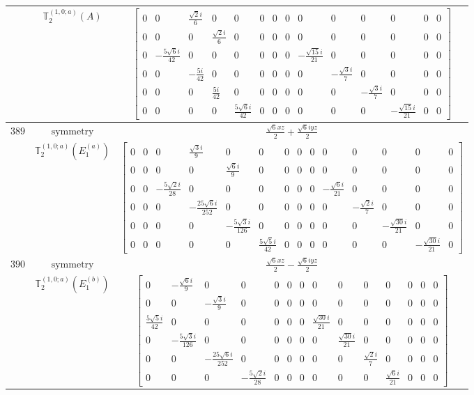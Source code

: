 \documentclass[fleqn,8pt,landscape]{jsarticle}
\begin{document}
\begin{longtable}{ccc}
$  $ & $ \mathbb{T}_{2}^{(1,0;a)}(A) $ & $ \begin{bmatrix} 0 & 0 & \frac{\sqrt{2} i}{6} & 0 & 0 & 0 & 0 & 0 & 0 & 0 & 0 & 0 & 0 & 0 \\ 0 & 0 & 0 & \frac{\sqrt{2} i}{6} & 0 & 0 & 0 & 0 & 0 & 0 & 0 & 0 & 0 & 0 \\ 0 & - \frac{5 \sqrt{6} i}{42} & 0 & 0 & 0 & 0 & 0 & 0 & - \frac{\sqrt{15} i}{21} & 0 & 0 & 0 & 0 & 0 \\ 0 & 0 & - \frac{5 i}{42} & 0 & 0 & 0 & 0 & 0 & 0 & - \frac{\sqrt{3} i}{7} & 0 & 0 & 0 & 0 \\ 0 & 0 & 0 & \frac{5 i}{42} & 0 & 0 & 0 & 0 & 0 & 0 & - \frac{\sqrt{3} i}{7} & 0 & 0 & 0 \\ 0 & 0 & 0 & 0 & \frac{5 \sqrt{6} i}{42} & 0 & 0 & 0 & 0 & 0 & 0 & - \frac{\sqrt{15} i}{21} & 0 & 0 \end{bmatrix} $ \\ \hline
$ 389 $ & $ \text{symmetry} $ & $ \frac{\sqrt{6} x z}{2} + \frac{\sqrt{6} i y z}{2} $ \\
$  $ & $ \mathbb{T}_{2}^{(1,0;a)}(E_{1}^{(a)}) $ & $ \begin{bmatrix} 0 & 0 & 0 & \frac{\sqrt{3} i}{9} & 0 & 0 & 0 & 0 & 0 & 0 & 0 & 0 & 0 & 0 \\ 0 & 0 & 0 & 0 & \frac{\sqrt{6} i}{9} & 0 & 0 & 0 & 0 & 0 & 0 & 0 & 0 & 0 \\ 0 & 0 & - \frac{5 \sqrt{2} i}{28} & 0 & 0 & 0 & 0 & 0 & 0 & - \frac{\sqrt{6} i}{21} & 0 & 0 & 0 & 0 \\ 0 & 0 & 0 & - \frac{25 \sqrt{6} i}{252} & 0 & 0 & 0 & 0 & 0 & 0 & - \frac{\sqrt{2} i}{7} & 0 & 0 & 0 \\ 0 & 0 & 0 & 0 & - \frac{5 \sqrt{3} i}{126} & 0 & 0 & 0 & 0 & 0 & 0 & - \frac{\sqrt{30} i}{21} & 0 & 0 \\ 0 & 0 & 0 & 0 & 0 & \frac{5 \sqrt{5} i}{42} & 0 & 0 & 0 & 0 & 0 & 0 & - \frac{\sqrt{30} i}{21} & 0 \end{bmatrix} $ \\ \hline
$ 390 $ & $ \text{symmetry} $ & $ \frac{\sqrt{6} x z}{2} - \frac{\sqrt{6} i y z}{2} $ \\
$  $ & $ \mathbb{T}_{2}^{(1,0;a)}(E_{1}^{(b)}) $ & $ \begin{bmatrix} 0 & - \frac{\sqrt{6} i}{9} & 0 & 0 & 0 & 0 & 0 & 0 & 0 & 0 & 0 & 0 & 0 & 0 \\ 0 & 0 & - \frac{\sqrt{3} i}{9} & 0 & 0 & 0 & 0 & 0 & 0 & 0 & 0 & 0 & 0 & 0 \\ \frac{5 \sqrt{5} i}{42} & 0 & 0 & 0 & 0 & 0 & 0 & \frac{\sqrt{30} i}{21} & 0 & 0 & 0 & 0 & 0 & 0 \\ 0 & - \frac{5 \sqrt{3} i}{126} & 0 & 0 & 0 & 0 & 0 & 0 & \frac{\sqrt{30} i}{21} & 0 & 0 & 0 & 0 & 0 \\ 0 & 0 & - \frac{25 \sqrt{6} i}{252} & 0 & 0 & 0 & 0 & 0 & 0 & \frac{\sqrt{2} i}{7} & 0 & 0 & 0 & 0 \\ 0 & 0 & 0 & - \frac{5 \sqrt{2} i}{28} & 0 & 0 & 0 & 0 & 0 & 0 & \frac{\sqrt{6} i}{21} & 0 & 0 & 0 \end{bmatrix} $ \\ \hline

\end{longtable}
\end{document}
